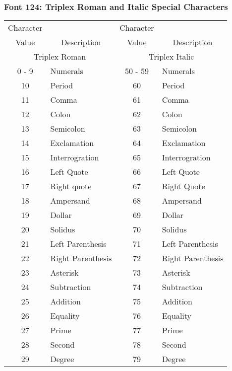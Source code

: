 \subsubsection{Font 124: Triplex Roman and Italic Special Characters}
\begin{tabular}{|c|l|c|l|}
\hline
\multicolumn{1}{|c|}{Character}
& & \multicolumn{1}{|c|}{Character}&\\
\multicolumn{1}{|c|}{Value}
&\multicolumn{1}{|c|}{Description}
&\multicolumn{1}{|c|}{Value}
&\multicolumn{1}{|c|}{Description}\\
\hline
\multicolumn{2}{|c|}{Triplex Roman}
&\multicolumn{2}{|c|}{Triplex Italic}\\
\hline
0 - 9 & Numerals & 50 - 59 & Numerals\\
10 & Period & 60 & Period\\
11 & Comma & 61 & Comma\\
12 & Colon & 62 & Colon\\
13 & Semicolon & 63 & Semicolon\\
14 & Exclamation & 64 & Exclamation\\
15 & Interrogration & 65 & Interrogration\\
16 & Left Quote & 66 & Left Quote\\
17 & Right quote & 67 & Right Quote\\
18 & Ampersand & 68 & Ampersand\\
19 & Dollar & 69 & Dollar\\
20 & Solidus & 70 & Solidus\\
21 & Left Parenthesis & 71 & Left Parenthesis\\
22 & Right Parenthesis & 72 & Right Parenthesis\\
23 & Asterisk & 73 & Asterisk\\
24 & Subtraction & 74 & Subtraction\\
25 & Addition & 75 & Addition\\
26 & Equality & 76 & Equality\\
27 & Prime & 77 & Prime\\
28 & Second & 78 & Second\\
29 & Degree & 79 & Degree\\ \hline
\end{tabular}
\newpage
